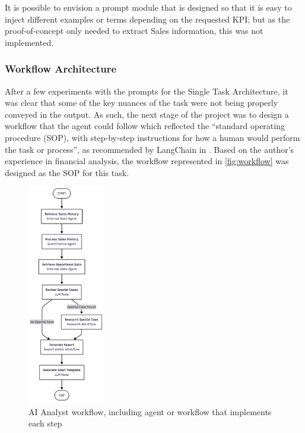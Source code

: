 \documentclass[a4paper]{report}
\begin{document}
It is possible to envision a prompt module that is designed so that it is easy to inject different examples or terms depending on the requested KPI; but as the proof-of-concept only needed to extract Sales information, this was not implemented.

\subsubsection{Workflow Architecture}

After a few experiments with the prompts for the Single Task Architecture, it was clear that some of the key nuances of the task were not being properly conveyed in the output. As such, the next stage of the project was to design a workflow that the agent could follow which reflected the ``standard operating procedure (SOP), with step-by-step instructions for how a human would perform the task or process'', as recommended by LangChain in \cite{langchain2025buildAgent}. Based on the author's experience in financial analysis, the workflow represented in \autoref{fig:workflow} was designed as the SOP for this task.

\begin{figure}[h]
\centering
\includegraphics[width=0.3\textwidth]{images/workflow.png}
\caption{AI Analyst workflow, including agent or workflow that implements each step}
\label{fig:workflow}
\end{figure}
\end{document}

